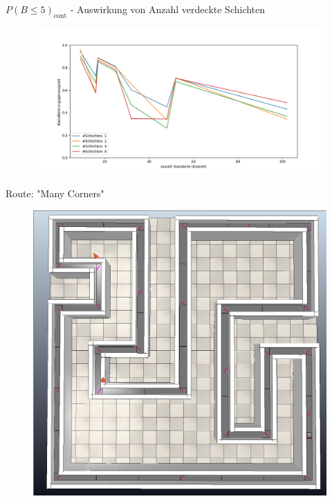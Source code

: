 \documentclass[10pt]{beamer}
\begin{document}
\begin{frame}{$P(B\leq5)_{\text{cont}}$ - Auswirkung von Anzahl verdeckte Schichten}
    \begin{figure}
        \centering
        \includegraphics[width=\linewidth]{location_recognition/multiple_best_by_group_knn_layers_acc_5_cont.png}
    \end{figure}
\end{frame}

\begin{frame}{Route: "Many Corners"}
    \begin{figure}
        \centering
        \includegraphics[width=0.8\linewidth]{routes/many_corners.png}
    \end{figure}
\end{frame}
\end{document}
